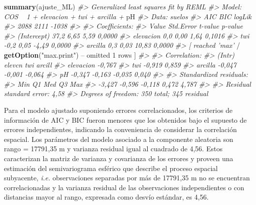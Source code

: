 \documentclass[11pt,b5paper,]{krantz}
\newenvironment{Shaded}{}{}
\newcommand{\KeywordTok}[1]{\textcolor[rgb]{0.00,0.44,0.13}{\textbf{#1}}}
\newcommand{\DecValTok}[1]{\textcolor[rgb]{0.25,0.63,0.44}{#1}}
\newcommand{\StringTok}[1]{\textcolor[rgb]{0.25,0.44,0.63}{#1}}
\newcommand{\CommentTok}[1]{\textcolor[rgb]{0.38,0.63,0.69}{\textit{#1}}}
\newcommand{\OperatorTok}[1]{\textcolor[rgb]{0.40,0.40,0.40}{#1}}
\newcommand{\NormalTok}[1]{#1}
\begin{document}
\begin{Shaded}
\begin{Highlighting}[]
\KeywordTok{summary}\NormalTok{(ajuste_ML)}
\CommentTok{#> Generalized least squares fit by REML}
\CommentTok{#> Model: COS ~ 1 + elevacion + twi + arcilla +}
\NormalTok{pH}
\CommentTok{#> Data: suelos}
\CommentTok{#> AIC BIC logLik}
\CommentTok{#> 2088 2111 -1038}
\CommentTok{#>}
\CommentTok{#> Coefficients:}
\CommentTok{#> Value Std.Error t-value p-value}
\CommentTok{#> (Intercept) 37,2 6,65 5,59 0,0000}
\CommentTok{#> elevacion 0,0 0,00 1,64 0,1016}
\CommentTok{#> twi -0,2 0,05 -4,49 0,0000}
\CommentTok{#> arcilla 0,3 0,03 10,83 0,0000}
\CommentTok{#> [ reached 'max'}
    \OperatorTok{/}\StringTok{ }\KeywordTok{getOption}\NormalTok{(}\StringTok{"max.print"}\NormalTok{) }\OperatorTok{--}
\NormalTok{omitted }\DecValTok{1}\NormalTok{ rows ]}
\CommentTok{#>}
\CommentTok{#> Correlation:}
\CommentTok{#> (Intr) elevcn twi arcill}
\CommentTok{#> elevacion -0,767}
\CommentTok{#> twi -0,919 0,859}
\CommentTok{#> arcilla -0,047 -0,001 -0,064}
\CommentTok{#> pH -0,347 -0,163 -0,035 0,040}
\CommentTok{#>}
\CommentTok{#> Standardized residuals:}
\CommentTok{#> Min Q1 Med Q3 Max}
\CommentTok{#> -3,427 -0,596 -0,118 0,472 4,787}
\CommentTok{#>}
\CommentTok{#> Residual standard error: 4,58}
\CommentTok{#> Degrees of freedom: 350 total; 345 residual}
\end{Highlighting}
\end{Shaded}

Para el modelo ajustado suponiendo errores correlacionados, los
criterios de información de AIC y BIC fueron menores que los obtenidos
bajo el supuesto de errores independientes, indicando la conveniencia de
considerar la correlación espacial. Los parámetros del modelo asociado a
la componente aleatoria son rango = 17791,35 m y varianza residual igual
al cuadrado de 4,56. Estos caracterizan la matriz de varianza y
covarianza de los errores y proveen una estimación del semivariograma
esférico que describe el proceso espacial subyacente, \emph{i.e.}
observaciones separadas por más de 17791,35 m no se encuentran
correlacionadas y la varianza residual de las observaciones
independientes o con distancias mayor al rango, expresada como desvío
estándar, es 4,56.
\end{document}
